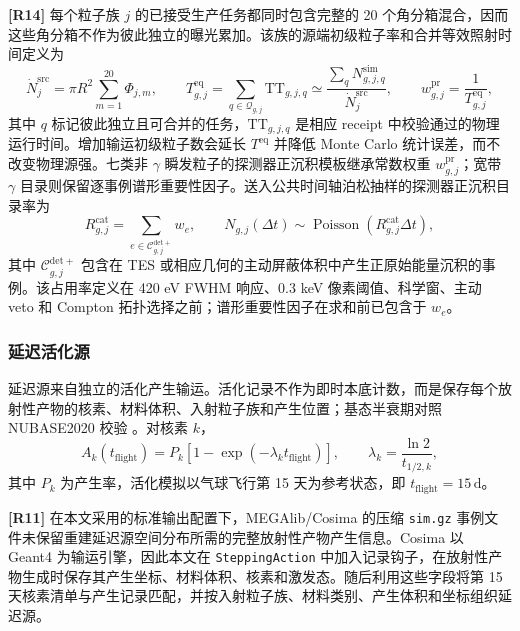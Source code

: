 \documentclass[11pt]{article}
\begin{document}
\begingroup
\color{revisionblue}
\noindent\textbf{[R14]} 每个粒子族 $j$ 的已接受生产任务都同时包含完整的 20 个角分箱混合，因而这些角分箱不作为彼此独立的曝光累加。该族的源端初级粒子率和合并等效照射时间定义为
\begin{equation}
 \dot N^{\mathrm{src}}_{j}=\pi R^2\sum_{m=1}^{20}\Phi_{j,m},
 \qquad
 T^{\mathrm{eq}}_{g,j}=\sum_{q\in\mathcal Q_{g,j}}\mathrm{TT}_{g,j,q}
 \simeq
 \frac{\sum_q N^{\mathrm{sim}}_{g,j,q}}{\dot N^{\mathrm{src}}_{j}},
 \qquad
 w^{\mathrm{pr}}_{g,j}=\frac{1}{T^{\mathrm{eq}}_{g,j}},
 \label{eq:prompt_equivalent_exposure_zh}
\end{equation}
其中 $q$ 标记彼此独立且可合并的任务，$\mathrm{TT}_{g,j,q}$ 是相应 receipt 中校验通过的物理运行时间。增加输运初级粒子数会延长 $T^{\mathrm{eq}}$ 并降低 Monte Carlo 统计误差，而不改变物理源强。七类非 $\gamma$ 瞬发粒子的探测器正沉积模板继承常数权重 $w^{\mathrm{pr}}_{g,j}$；宽带 $\gamma$ 目录则保留逐事例谱形重要性因子。送入公共时间轴泊松抽样的探测器正沉积目录率为
\begin{equation}
 R^{\mathrm{cat}}_{g,j}=\sum_{e\in\mathcal C^{\mathrm{det+}}_{g,j}}w_e,
 \qquad
 N_{g,j}(\Delta t)\sim
 \operatorname{Poisson}\!\left(R^{\mathrm{cat}}_{g,j}\Delta t\right),
 \label{eq:catalog_poisson_rate_zh}
\end{equation}
其中 $\mathcal C^{\mathrm{det+}}_{g,j}$ 包含在 TES 或相应几何的主动屏蔽体积中产生正原始能量沉积的事例。该占用率定义在 420 eV FWHM 响应、0.3 keV 像素阈值、科学窗、主动 veto 和 Compton 拓扑选择之前；谱形重要性因子在求和前已包含于 $w_e$。
\endgroup

\subsubsection{延迟活化源}
\label{subsec:delayed_source}

延迟源来自独立的活化产生输运。活化记录不作为即时本底计数，而是保存每个放射性产物的核素、材料体积、入射粒子族和产生位置；基态半衰期对照 NUBASE2020 校验 \cite{Kondev2021NUBASE}。对核素 $k$，
\begin{equation}
  A_k(t_{\mathrm{flight}})=P_k\left[1-\exp(-\lambda_k t_{\mathrm{flight}})\right],
  \qquad \lambda_k=\frac{\ln2}{t_{1/2,k}},
\end{equation}
其中 $P_k$ 为产生率，活化模拟以气球飞行第 15 天为参考状态，即
$t_{\mathrm{flight}}=15\,\mathrm{d}$。

\begingroup
\color{revisionblue}
\noindent\textbf{[R11]} 在本文采用的标准输出配置下，MEGAlib/Cosima 的压缩 \texttt{sim.gz} 事例文件未保留重建延迟源空间分布所需的完整放射性产物产生信息。Cosima 以 Geant4 为输运引擎，因此本文在 \texttt{SteppingAction} 中加入记录钩子，在放射性产物生成时保存其产生坐标、材料体积、核素和激发态。随后利用这些字段将第 15 天核素清单与产生记录匹配，并按入射粒子族、材料类别、产生体积和坐标组织延迟源。
\end{document}
